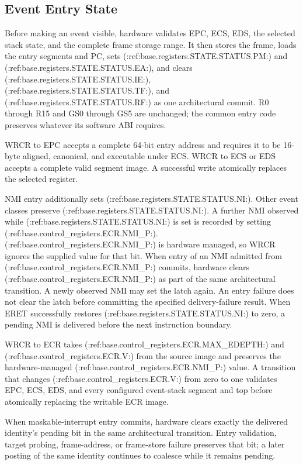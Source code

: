 \subsection{Event Entry State}
Before making an event visible, hardware validates EPC, ECS, EDS, the selected stack state, and the complete frame
storage range. It then stores the frame, loads the entry segments and PC, sets (:ref:base.registers.STATE.STATUS.PM:) and (:ref:base.registers.STATE.STATUS.EA:), and clears
(:ref:base.registers.STATE.STATUS.IE:), (:ref:base.registers.STATE.STATUS.TF:), and (:ref:base.registers.STATE.STATUS.RF:) as one architectural commit. R0 through R15 and GS0 through GS5 are unchanged;
the common entry code preserves whatever its software ABI requires.

WRCR to EPC accepts a complete 64-bit entry address and requires it to be 16-byte aligned, canonical, and executable under
ECS. WRCR to ECS or EDS accepts a complete valid segment image. A successful write atomically replaces the selected register.

NMI entry additionally sets (:ref:base.registers.STATE.STATUS.NI:). Other event classes preserve (:ref:base.registers.STATE.STATUS.NI:). A further NMI observed while (:ref:base.registers.STATE.STATUS.NI:) is set is
recorded by setting (:ref:base.control_registers.ECR.NMI_P:). (:ref:base.control_registers.ECR.NMI_P:) is hardware managed, so WRCR ignores the supplied value for that bit.
When entry of an NMI admitted from (:ref:base.control_registers.ECR.NMI_P:) commits, hardware clears (:ref:base.control_registers.ECR.NMI_P:) as part of the same architectural
transition. A newly observed NMI may set the latch again. An entry failure does not clear the latch before committing
the specified delivery-failure result. When ERET successfully restores (:ref:base.registers.STATE.STATUS.NI:) to zero, a pending NMI is delivered before
the next instruction boundary.

WRCR to ECR takes (:ref:base.control_registers.ECR.MAX_EDEPTH:) and (:ref:base.control_registers.ECR.V:) from the source image and preserves the
hardware-managed (:ref:base.control_registers.ECR.NMI_P:) value. A transition that changes (:ref:base.control_registers.ECR.V:) from zero to one validates EPC, ECS, EDS,
and every configured event-stack segment and top before atomically replacing the writable ECR image.

When maskable-interrupt entry commits, hardware clears exactly the delivered identity's pending bit in the same
architectural transition. Entry validation, target probing, frame-address, or frame-store failure preserves that bit;
a later posting of the same identity continues to coalesce while it remains pending.

